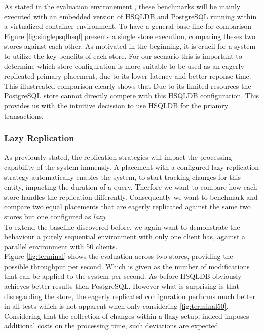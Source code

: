 As stated in the evaluation environement , these benchmarks will be mainly executed with an embedded version of HSQLDB and PostgreSQL running within a virtualized 
container environment. To have a general base line for comparison Figure \ref{fig:singlepsqlhsql} presents a single store execution, comparing theses two stores against each other.
As motivated in the beginning, it is crucil for a system to utilize the key benefits of each store. For our scenario this is important to determine which 
store configuration is more suitable to be used as an eagerly replicated primary placement, due to its lower latency and better reponse time.\\
This illustreated comparison clearly shows that Due to its limited resources the PostgreSQL store cannot directly compete with this HSQLDB configuration.
This provides us with the intuitive decission to use HSQLDB for the priamry transactions.








\subsubsection{Lazy Replication} 


As previously stated, the replication strategies will impact the processing capability of the system immensly.
A placement with a configured lazy replication strategy automatically enables the system, to start tracking changes for this entity, impacting the duration of a query.
Therfore we want to compare how each store handles the replication differently. Consequently we want to benchmark and compare two equal placements that are eagerly replicated
against the same two stores but one configured as \emph{lazy}.\\

To extend the baseline discovered before, we again want to demonstrate the behaviour a purely sequential environment with only one client has, 
against a parallel environment with 50 clients.\\
Figure \ref{fig:terminal} shows the evaluation across two stores, providing the possible throughput per second. Which is given as the number of modifications that can be 
applied to the system per second. As before HSQLDB obviously achieves better results then PostgreSQL. However what is surprising is that disregarding the store,
the eagerly replicated configuration performs much better in all tests which is not apparent when only considering \ref{fig:terminal50}.
Considering that the collection of changes within a llazy setup, indeed imposes additional costs on the processing time, such deviations are expected.

